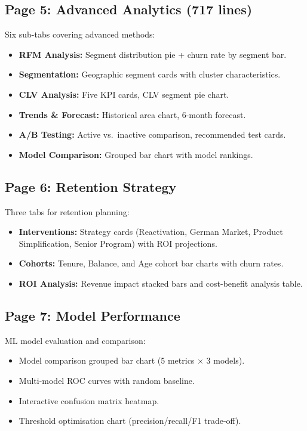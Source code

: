 \documentclass[12pt, a4paper]{report}
\begin{document}
\subsection{Page 5: Advanced Analytics (717 lines)}

Six sub-tabs covering advanced methods:
\begin{itemize}
    \item \textbf{RFM Analysis:} Segment distribution pie + churn rate by segment bar.
    \item \textbf{Segmentation:} Geographic segment cards with cluster characteristics.
    \item \textbf{CLV Analysis:} Five KPI cards, CLV segment pie chart.
    \item \textbf{Trends \& Forecast:} Historical area chart, 6-month forecast.
    \item \textbf{A/B Testing:} Active vs.\ inactive comparison, recommended test cards.
    \item \textbf{Model Comparison:} Grouped bar chart with model rankings.
\end{itemize}

\subsection{Page 6: Retention Strategy}

Three tabs for retention planning:
\begin{itemize}
    \item \textbf{Interventions:} Strategy cards (Reactivation, German Market, Product Simplification, Senior Program) with ROI projections.
    \item \textbf{Cohorts:} Tenure, Balance, and Age cohort bar charts with churn rates.
    \item \textbf{ROI Analysis:} Revenue impact stacked bars and cost-benefit analysis table.
\end{itemize}

\subsection{Page 7: Model Performance}

ML model evaluation and comparison:
\begin{itemize}
    \item Model comparison grouped bar chart (5 metrics $\times$ 3 models).
    \item Multi-model ROC curves with random baseline.
    \item Interactive confusion matrix heatmap.
    \item Threshold optimisation chart (precision/recall/F1 trade-off).
\end{itemize}
\end{document}
